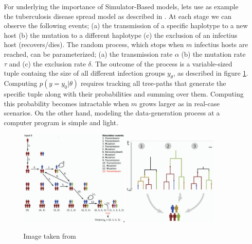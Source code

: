 \documentclass[11pt,twoside]{article}
\numberwithin{Theorem}{section}
\numberwithin{Definition}{section}
\numberwithin{Lemma}{section}
\numberwithin{Algorithm}{section}
\numberwithin{equation}{section}
\begin{document}
For underlying the importance of Simulator-Based models, lets use as example the tuberculosis disease spread model as described in \cite{Tanaka2006}. At each stage we can observe the following events; (a) the transmission of a specific haplotype to a new host (b) the mutation to a different haplotype (c) the exclusion of an infectius host (recovers/dies). The random process, which stops when $m$ infectius hosts are reached, can be parameterized; (a) the transmission rate $\alpha$ (b) the mutation rate $\tau$ and (c) the exclusion rate $\delta$. The outcome of the process is a variable-sized tuple containg the size of all different infection groups $y_\theta$, as described in figure \ref{fig:tuberculosis_model}. Computing $p(y=y_0|\theta)$ requires tracking all tree-paths that generate the specific tuple along with their probabilities and summing over them. Computing this probability becomes intractable when $m$ grows larger as in real-case scenarios. On the other hand, modeling the data-generation process at a computer program is simple and light.

\begin{figure}[!t]
    \begin{center}
      \includegraphics[width=0.49\textwidth]{./images/chapter1/tuber_model_1.png}
      \includegraphics[width=0.42\textwidth]{./images/chapter1/tuber_model_2.png}
    \end{center}
    \caption{Image taken from \cite{Lintusaari2017}}
    \label{fig:tuberculosis_model}
\end{figure}
\end{document}
